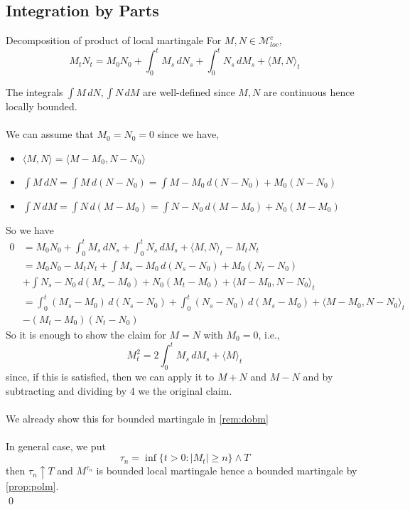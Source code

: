 \documentclass[12pt,a4paper]{article}
\renewenvironment{proof}
    {\begin{trivlist}\item[\hskip\labelsep\color{blue}\bfseries Proof:]}
    {\qed\end{trivlist}}
\begin{document}
\subsection{Integration by Parts}
\begin{theorem}{Decomposition of product of local martingale}{}
    For $M,N\in\mathcal{M}^c_{loc}$,
    $$
    M_tN_t = M_0N_0 + \int_0^t M_s\, dN_s + \int_0^t N_s\,dM_s + \langle M, N\rangle_t
    $$
\end{theorem}
\begin{proof}
    The integrals $\int M\, dN, \int N\, dM$ are well-defined since $M,N$ are continuous hence locally bounded.\\
    \\
    We can assume that $M_0=N_0=0$ since we have,
    \begin{itemize}
        \item $\langle M, N\rangle = \langle M-M_0, N-N_0\rangle$
        \item $\int M\, dN = \int M\, d(N-N_0) = \int M-M_0\, d(N-N_0)+M_0(N-N_0)$
        \item $\int N\, dM = \int N\, d(M-M_0) = \int N-N_0\, d(M-M_0)+N_0(M-M_0)$
    \end{itemize}
    So we have
    \begin{align*}
        0&= M_0N_0 + \int_0^t M_s\, dN_s + \int_0^t N_s\, dM_s + \langle M, N\rangle_t -M_tN_t\\
        &= M_0N_0 -M_tN_t + \int M_s-M_0\, d(N_s-N_0)+M_0(N_t-N_0)\\
        &+ \int N_s-N_0\, d(M_s-M_0)+N_0(M_t-M_0) + \langle M-M_0, N-N_0\rangle_t\\
        &= \int_0^t (M_s-M_0)\, d(N_s-N_0) + \int_0^t (N_s-N_0)\, d(M_s-M_0)+ \langle M-M_0, N-N_0\rangle_t\\
        &- (M_t-M_0)(N_t-N_0)
    \end{align*}
    So it is enough to show the claim for $M=N$ with $M_0=0$, i.e.,
    $$
    M_t^2 = 2\int_0^t M_s\, dM_s + \langle M\rangle_t
    $$
    since, if this is satisfied, then we can apply it to $M+N$ and $M-N$ and by subtracting and dividing by 4 we the original claim.\\
    \\
    We already show this for bounded martingale in \autoref{rem:dobm}\\
    \\
    In general case, we put
    $$
    \tau_n = \inf\{t>0: |M_t|\ge n\}\wedge T
    $$
    then $\tau_n\uparrow T$ and $M^{\tau_n}$ is bounded local martingale hence a bounded martingale by \autoref{prop:polm}.\\

\end{proof}
\end{document}
